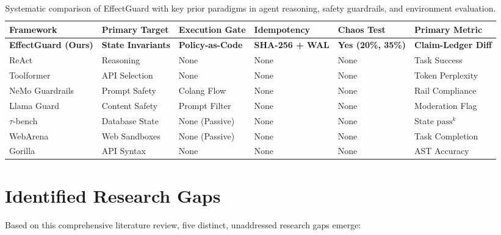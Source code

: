 \begin{table}[H]
\centering
\small
\renewcommand{\arraystretch}{1.25}
\begin{tabular}{|p{3.2cm}|p{2.2cm}|p{2.4cm}|p{2.2cm}|p{1.8cm}|p{2.6cm}|}
\hline
\rowcolor{gray!15}
\textbf{Framework} & \textbf{Primary Target} & \textbf{Execution Gate} & \textbf{Idempotency} & \textbf{Chaos Test} & \textbf{Primary Metric} \\
\hline
\textbf{EffectGuard (Ours)} & \textbf{State Invariants} & \textbf{Policy-as-Code} & \textbf{SHA-256 + WAL} & \textbf{Yes (20\%, 35\%)} & \textbf{Claim-Ledger Diff} \\
\hline
ReAct \cite{yao2022react} & Reasoning & None & None & None & Task Success \\
\hline
Toolformer \cite{schick2023toolformer} & API Selection & None & None & None & Token Perplexity \\
\hline
NeMo Guardrails \cite{rebedea2023nemo} & Prompt Safety & Colang Flow & None & None & Rail Compliance \\
\hline
Llama Guard \cite{inan2023llama} & Content Safety & Prompt Filter & None & None & Moderation Flag \\
\hline
$\tau$-bench \cite{yao2024taubench} & Database State & None (Passive) & None & None & State $\text{pass}^k$ \\
\hline
WebArena \cite{zhou2023webarena} & Web Sandboxes & None (Passive) & None & None & Task Completion \\
\hline
Gorilla \cite{patil2023gorilla} & API Syntax & None & None & None & AST Accuracy \\
\hline
\end{tabular}
\caption{Systematic comparison of EffectGuard with key prior paradigms in agent reasoning, safety guardrails, and environment evaluation.}
\label{tab:comparison}
\end{table}

\section{Identified Research Gaps}

Based on this comprehensive literature review, five distinct, unaddressed research gaps emerge:

